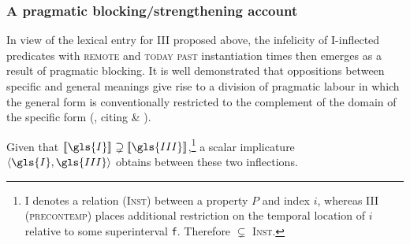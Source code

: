 \subsubsection{A pragmatic blocking/strengthening account}

In view of the lexical entry for \gls{III} proposed above, the infelicity of \gls{I}-inflected predicates with \textsc{remote} and \textsc{today past} instantiation times then emerges as a result of pragmatic blocking. It is well demonstrated that oppositions between specific and general meanings give rise to a division of pragmatic labour in which the general form is conventionally restricted to the complement of the domain of the specific form (\citealp{Deo2015}, citing \citealp{Horn1984} \& \citealp{Horn2012a}).


Given that $ \denote{\gls{I}} \supsetneq \denote{\gls{III}}$,\footnote{
	\gls{I} denotes a relation \textsc{(Inst)} between a property $ P $ and index $ i $, whereas \gls{III} \textsc{(precontemp)} places additional restriction on the temporal location of $ i $ relative to some superinterval \texttt{f}. Therefore $ \subsetneq $ \textsc{Inst}.
}
a scalar implicature $ \langle \gls{I},\gls{III}\rangle$ obtains between these two inflections.



